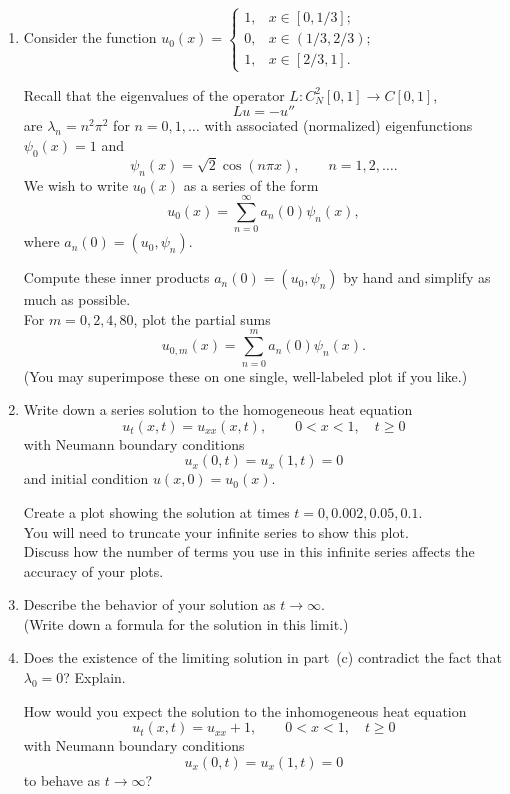 \begin{enumerate}
\item
Consider the function 
${\displaystyle{u_0(x) = \left\{\begin{array}{ll}
                      1,  & x \in [0,1/3]; \\
                      0,  & x \in (1/3,2/3); \\
                      1,  & x \in [2/3,1].
              \end{array}\right.}}$

Recall that the eigenvalues of the operator $L: C_N^2[0,1] \to C[0,1]$,
          \[ L u = -u'' \]
      are $\lambda_n = n^2 \pi^2$ for $n=0, 1, \ldots$ 
      with associated (normalized) eigenfunctions $\psi_0(x) = 1$ and 
      \[ \psi_n(x) = \sqrt{2} \cos(n\pi x), \qquad n = 1, 2, \ldots.\]
      We wish to write $u_0(x)$ as a series of the form
           \[ u_0(x) = \sum_{n=0}^\infty a_n(0) \psi_n(x),\]
      where $a_n(0) = (u_0, \psi_n)$.

      Compute these inner products $a_n(0) = (u_0, \psi_n)$ 
      by hand and simplify as much as possible.\\
      For $m = 0, 2, 4, 80$, plot the partial sums 
           \[ u_{0,m}(x) = \sum_{n=0}^m a_n(0) \psi_n(x).\]
      (You may superimpose these on one single, well-labeled plot if you like.)

\item Write down a series solution to the homogeneous heat equation
\[ u_t(x,t) = u_{xx}(x,t), \qquad 0<x<1, \quad t\ge 0 \]
with Neumann boundary conditions
\[ u_x(0,t) = u_x(1,t) = 0\]
and initial condition $u(x,0) = u_0(x)$.

Create a plot showing the solution at times $t=0, 0.002, 0.05, 0.1$.\\
You will need to truncate your infinite series to show this plot.\\
Discuss how the number of terms you use in this infinite series 
affects the accuracy of your plots.

\vspace*{1em}
\item Describe the behavior of your solution as $t\to \infty$.\\
      (Write down a formula for the solution in this limit.)

\vspace*{1em}
\item Does the existence of the limiting solution in part~(c) contradict the fact 
      that $\lambda_0 = 0$?  Explain. 

      How would you expect the solution to the inhomogeneous heat equation
\[ u_t(x,t) = u_{xx}+ 1, \qquad 0<x<1, \quad t\ge 0 \]
with Neumann boundary conditions
\[ u_x(0,t) = u_x(1,t) = 0\]
to behave as $t\to\infty$?
\end{enumerate}

